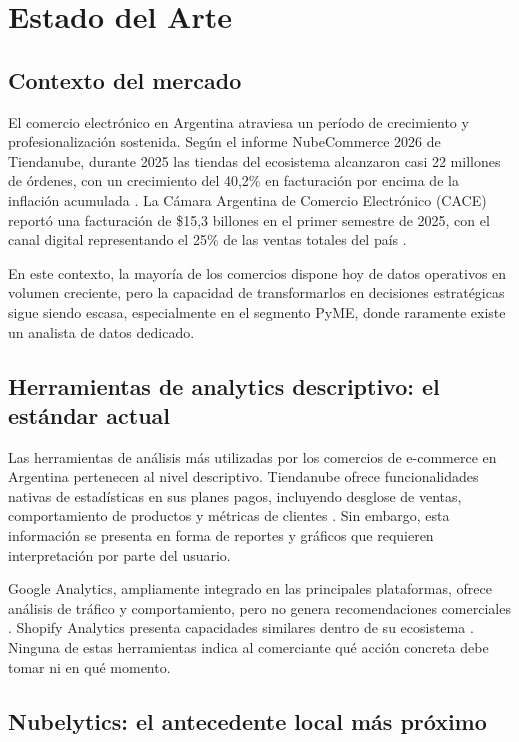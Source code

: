 \chapter{Estado del Arte}

\section{Contexto del mercado}

El comercio electrónico en Argentina atraviesa un período de crecimiento y profesionalización sostenida. Según el informe NubeCommerce 2026 de Tiendanube, durante 2025 las tiendas del ecosistema alcanzaron casi 22 millones de órdenes, con un crecimiento del 40,2\% en facturación por encima de la inflación acumulada \parencite{Tiendanube2026}. La Cámara Argentina de Comercio Electrónico (CACE) reportó una facturación de \$15,3 billones en el primer semestre de 2025, con el canal digital representando el 25\% de las ventas totales del país \parencite{CACE2025}.

En este contexto, la mayoría de los comercios dispone hoy de datos operativos en volumen creciente, pero la capacidad de transformarlos en decisiones estratégicas sigue siendo escasa, especialmente en el segmento PyME, donde raramente existe un analista de datos dedicado.

\section{Herramientas de analytics descriptivo: el estándar actual}

Las herramientas de análisis más utilizadas por los comercios de e-commerce en Argentina pertenecen al nivel descriptivo. Tiendanube ofrece funcionalidades nativas de estadísticas en sus planes pagos, incluyendo desglose de ventas, comportamiento de productos y métricas de clientes \parencite{TiendanubeEstadisticas2025}. Sin embargo, esta información se presenta en forma de reportes y gráficos que requieren interpretación por parte del usuario.

Google Analytics, ampliamente integrado en las principales plataformas, ofrece análisis de tráfico y comportamiento, pero no genera recomendaciones comerciales \parencite{GoogleAnalytics2025}. Shopify Analytics presenta capacidades similares dentro de su ecosistema \parencite{ShopifyAnalytics2025}. Ninguna de estas herramientas indica al comerciante qué acción concreta debe tomar ni en qué momento.

\section{Nubelytics: el antecedente local más próximo}

